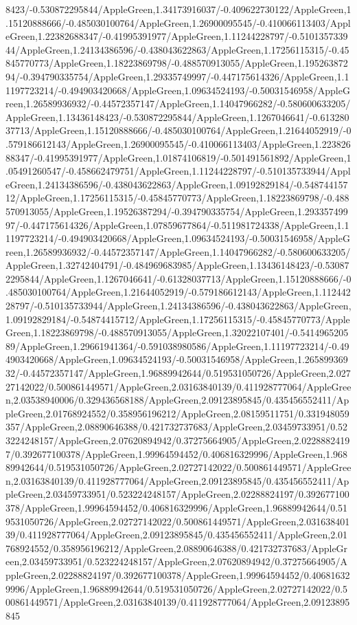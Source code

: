 {\begin{tikzternal}
{8423/-0.530872295844/AppleGreen,1.34173916037/-0.409622730122/AppleGreen,1.15120888666/-0.485030100764/AppleGreen,1.26900095545/-0.410066113403/AppleGreen,1.22382688347/-0.41995391977/AppleGreen,1.11244228797/-0.510135733944/AppleGreen,1.24134386596/-0.438043622863/AppleGreen,1.17256115315/-0.45845770773/AppleGreen,1.18223869798/-0.488570913055/AppleGreen,1.19526387294/-0.394790335754/AppleGreen,1.29335749997/-0.447175614326/AppleGreen,1.11197723214/-0.494903420668/AppleGreen,1.09634524193/-0.50031546958/AppleGreen,1.26589936932/-0.44572357147/AppleGreen,1.14047966282/-0.580600633205/AppleGreen,1.13436148423/-0.530872295844/AppleGreen,1.1267046641/-0.61328037713/AppleGreen,1.15120888666/-0.485030100764/AppleGreen,1.21644052919/-0.579186612143/AppleGreen,1.26900095545/-0.410066113403/AppleGreen,1.22382688347/-0.41995391977/AppleGreen,1.01874106819/-0.501491561892/AppleGreen,1.05491260547/-0.458662479751/AppleGreen,1.11244228797/-0.510135733944/AppleGreen,1.24134386596/-0.438043622863/AppleGreen,1.09192829184/-0.54874415712/AppleGreen,1.17256115315/-0.45845770773/AppleGreen,1.18223869798/-0.488570913055/AppleGreen,1.19526387294/-0.394790335754/AppleGreen,1.29335749997/-0.447175614326/AppleGreen,1.07859677864/-0.511981724338/AppleGreen,1.11197723214/-0.494903420668/AppleGreen,1.09634524193/-0.50031546958/AppleGreen,1.26589936932/-0.44572357147/AppleGreen,1.14047966282/-0.580600633205/AppleGreen,1.32742404791/-0.484969683985/AppleGreen,1.13436148423/-0.530872295844/AppleGreen,1.1267046641/-0.61328037713/AppleGreen,1.15120888666/-0.485030100764/AppleGreen,1.21644052919/-0.579186612143/AppleGreen,1.11244228797/-0.510135733944/AppleGreen,1.24134386596/-0.438043622863/AppleGreen,1.09192829184/-0.54874415712/AppleGreen,1.17256115315/-0.45845770773/AppleGreen,1.18223869798/-0.488570913055/AppleGreen,1.32022107401/-0.541496520589/AppleGreen,1.29661941364/-0.591038980586/AppleGreen,1.11197723214/-0.494903420668/AppleGreen,1.09634524193/-0.50031546958/AppleGreen,1.26589936932/-0.44572357147/AppleGreen,1.96889942644/0.519531050726/AppleGreen,2.02727142022/0.500861449571/AppleGreen,2.03163840139/0.411928777064/AppleGreen,2.03538940006/0.329436568188/AppleGreen,2.09123895845/0.435456552411/AppleGreen,2.01768924552/0.358956196212/AppleGreen,2.08159511751/0.331948059357/AppleGreen,2.08890646388/0.421732737683/AppleGreen,2.03459733951/0.523224248157/AppleGreen,2.07620894942/0.37275664905/AppleGreen,2.02288824197/0.392677100378/AppleGreen,1.99964594452/0.406816329996/AppleGreen,1.96889942644/0.519531050726/AppleGreen,2.02727142022/0.500861449571/AppleGreen,2.03163840139/0.411928777064/AppleGreen,2.09123895845/0.435456552411/AppleGreen,2.03459733951/0.523224248157/AppleGreen,2.02288824197/0.392677100378/AppleGreen,1.99964594452/0.406816329996/AppleGreen,1.96889942644/0.519531050726/AppleGreen,2.02727142022/0.500861449571/AppleGreen,2.03163840139/0.411928777064/AppleGreen,2.09123895845/0.435456552411/AppleGreen,2.01768924552/0.358956196212/AppleGreen,2.08890646388/0.421732737683/AppleGreen,2.03459733951/0.523224248157/AppleGreen,2.07620894942/0.37275664905/AppleGreen,2.02288824197/0.392677100378/AppleGreen,1.99964594452/0.406816329996/AppleGreen,1.96889942644/0.519531050726/AppleGreen,2.02727142022/0.500861449571/AppleGreen,2.03163840139/0.411928777064/AppleGreen,2.09123895845}
\end{tikzternal}}
